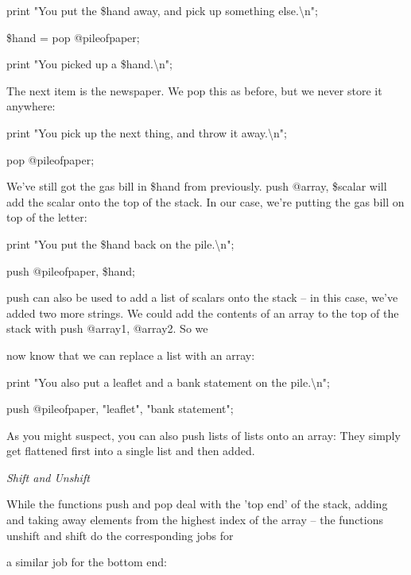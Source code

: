 \documentclass[a4paper,11pt]{book}
\begin{document}
\noindent print "You put the \$hand away, and pick up something else.\textbackslash n";

\noindent \$hand = pop @pileofpaper;

\noindent print "You picked up a \$hand.\textbackslash n";

\noindent 

\noindent The next item is the newspaper. We pop this as before, but we never store it anywhere:

\noindent 

\noindent print "You pick up the next thing, and throw it away.\textbackslash n";

\noindent pop @pileofpaper;

\noindent 

\noindent We've still got the gas bill in \$hand from previously. push @array, \$scalar will add the scalar onto the top of the stack. In our case, we're putting the gas bill on top of the letter:

\noindent 

\noindent print "You put the \$hand back on the pile.\textbackslash n";

\noindent push @pileofpaper, \$hand;

\noindent 

\noindent push can also be used to add a list of scalars onto the stack -- in this case, we've added two more strings. We could add the contents of an array to the top of the stack with push @array1, @array2. So we

\noindent now know that we can replace a list with an array:

\noindent 

\noindent print "You also put a leaflet and a bank statement on the pile.\textbackslash n";

\noindent push @pileofpaper, "leaflet", "bank statement";

\noindent 

\noindent As you might suspect, you can also push lists of lists onto an array: They simply get flattened first into a single list and then added.

\noindent 

\noindent \textit{Shift and Unshift}

\noindent While the functions push and pop deal with the 'top end' of the stack, adding and taking away elements from the highest index of the array -- the functions unshift and shift do the corresponding jobs for

\noindent a similar job for the bottom end:
\end{document}
